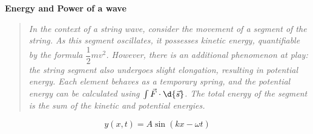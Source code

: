 \item \textbf{Energy and Power of a wave}
    \begin{center}
    \end{center}
    \begin{center}
        \begin{quote}
            \textit{In the context of a string wave, consider the movement of a segment of the string. As this segment oscillates, it possesses kinetic energy, quantifiable by the formula $\dfrac{1}{2}mv^2$. However, there is an additional phenomenon at play: the string segment also undergoes slight elongation, resulting in potential energy. Each element behaves as a temporary spring, and the potential energy can be calculated using $\int\vec{F}\cdot\d{\vec{s}}$. The total energy of the segment is the sum of the kinetic and potential energies.}
        \end{quote}
        \[ y(x, t) = A\sin\left(kx-\omega t\right) \]
    \end{center}
